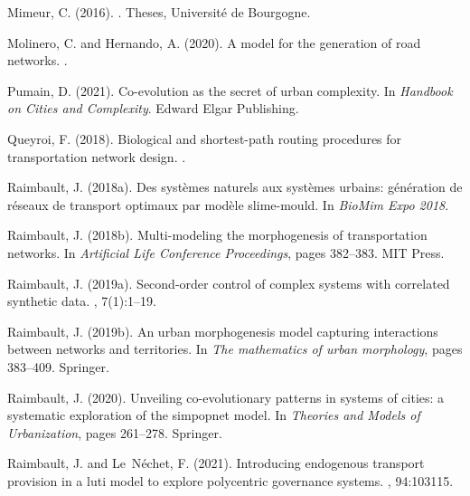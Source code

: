 \documentclass{article}
\begin{document}
\begin{thebibliography}{}
Mimeur, C. (2016).
.
\newblock Theses, {Universit{\'e} de Bourgogne}.

Molinero, C. and Hernando, A. (2020).
\newblock A model for the generation of road networks.
.

Pumain, D. (2021).
\newblock Co-evolution as the secret of urban complexity.
\newblock In {\em Handbook on Cities and Complexity}. Edward Elgar Publishing.

Queyroi, F. (2018).
\newblock Biological and shortest-path routing procedures for transportation
  network design.
.

Raimbault, J. (2018a).
\newblock Des syst{\`e}mes naturels aux syst{\`e}mes urbains:
  g{\'e}n{\'e}ration de r{\'e}seaux de transport optimaux par mod{\`e}le
  slime-mould.
\newblock In {\em BioMim Expo 2018}.

Raimbault, J. (2018b).
\newblock Multi-modeling the morphogenesis of transportation networks.
\newblock In {\em Artificial Life Conference Proceedings}, pages 382--383. MIT
  Press.

Raimbault, J. (2019a).
\newblock Second-order control of complex systems with correlated synthetic
  data.
, 7(1):1--19.

Raimbault, J. (2019b).
\newblock An urban morphogenesis model capturing interactions between networks
  and territories.
\newblock In {\em The mathematics of urban morphology}, pages 383--409.
  Springer.

Raimbault, J. (2020).
\newblock Unveiling co-evolutionary patterns in systems of cities: a systematic
  exploration of the simpopnet model.
\newblock In {\em Theories and Models of Urbanization}, pages 261--278.
  Springer.

Raimbault, J. and Le~N{\'e}chet, F. (2021).
\newblock Introducing endogenous transport provision in a luti model to explore
  polycentric governance systems.
, 94:103115.


\end{thebibliography}
\end{document}
